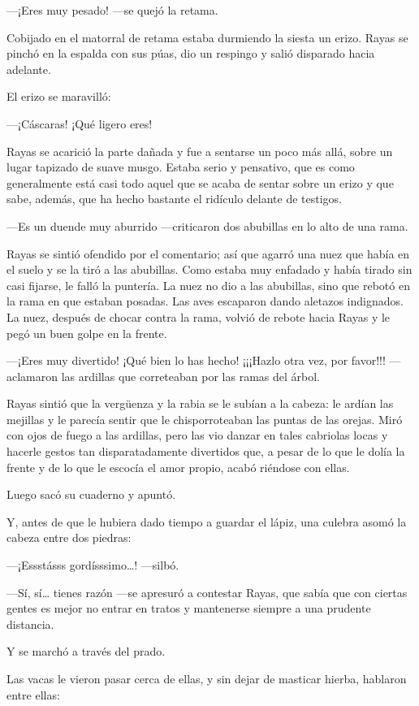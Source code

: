 \documentclass{barcodevapor3pags}
\begin{document}
---¡Eres muy pesado! ---se quejó la retama.

Cobijado en el matorral de retama estaba durmiendo la siesta un erizo.
Rayas se pinchó en la espalda con sus púas, dio un respingo y salió
disparado hacia adelante.

El erizo se maravilló:

---¡Cáscaras! ¡Qué ligero eres!

Rayas se acarició la parte dañada y fue a sentarse un poco más allá,
sobre un lugar tapizado de suave musgo. Estaba serio y pensativo, que es
como generalmente está casi todo aquel que se acaba de sentar sobre un
erizo y que sabe, además, que ha hecho bastante el ridículo delante de
testigos.

---Es un duende muy aburrido ---criticaron dos abubillas en lo alto de
una rama.

Rayas se sintió ofendido por el comentario; así que agarró una nuez que
había en el suelo y se la tiró a las abubillas. Como estaba muy enfadado
y había tirado sin casi fijarse, le falló la puntería. La nuez no dio a
las abubillas, sino que rebotó en la rama en que estaban posadas. Las
aves escaparon dando aletazos indignados. La nuez, después de chocar
contra la rama, volvió de rebote hacia Rayas y le pegó un buen golpe en
la frente.

---¡Eres muy divertido! ¡Qué bien lo has hecho! ¡¡¡Hazlo otra vez, por
favor!!! ---aclamaron las ardillas que correteaban por las ramas del
árbol.

Rayas sintió que la vergüenza y la rabia se le subían a la cabeza: le
ardían las mejillas y le parecía sentir que le chisporroteaban las
puntas de las orejas. Miró con ojos de fuego a las ardillas, pero las
vio danzar en tales cabriolas locas y hacerle gestos tan
disparatadamente divertidos que, a pesar de lo que le dolía la frente y
de lo que le escocía el amor propio, acabó riéndose con ellas.

Luego sacó su cuaderno y apuntó.

Y, antes de que le hubiera dado tiempo a guardar el lápiz, una culebra
asomó la cabeza entre dos piedras:

---¡Essstásss gordísssimo\ldots! ---silbó.

---Sí, sí\ldots{} tienes razón ---se apresuró a contestar Rayas, que
sabía que con ciertas gentes es mejor no entrar en tratos y mantenerse
siempre a una prudente distancia.

Y se marchó a través del prado.

Las vacas le vieron pasar cerca de ellas, y sin dejar de masticar
hierba, hablaron entre ellas:
\end{document}
